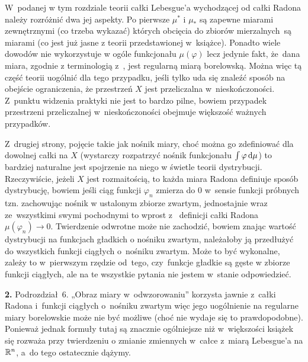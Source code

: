 \documentclass[a4paper,11pt]{article}
\begin{document}
\vspace{\spaceThree}

\start W~podanej w tym rozdziale teorii całki Lebesgue’a wychodzącej
od całki Radona należy rozróżnić dwa jej aspekty. Po pierwsze
$\mu^{ * }$ i $\mu_{ * }$ są zapewne miarami zewnętrznymi (co trzeba
wykazać) których obcięcia do zbiorów mierzalnych~są miarami (co jest
już jasne z teorii przedstawionej w~książce). Ponadto wiele dowodów
nie wykorzystuje w ogóle funkcjonału $\mu( \varphi )$ lecz jedynie fakt,
że~dana miara, zgodnie z terminologią z~\cite{RudinAnalizaRzeczywistaIZespolona1998}, jest regularną
miarą borelowską. Można więc tą część teorii uogólnić dla tego
przypadku, jeśli tylko uda się znaleźć sposób na obejście
ograniczenia, że przestrzeń $X$ jest przeliczalna w~nieskończoności.
Z~punktu widzenia praktyki nie jest to bardzo pilne, bowiem przypadek
przestrzeni przeliczalnej w~nieskończoności obejmuje większość ważnych
przypadków.

Z~drugiej strony, pojęcie takie jak nośnik miary, choć można go
zdefiniować dla dowolnej całki na $X$ (wystarczy rozpatrzyć nośnik
funkcjonału $\int \varphi \, \mathrm{d} \mu$) to bardziej naturalne jest
spojrzenie na niego w świetle teorii dystrybucji. Rzeczywiście, jeżeli
$X$ jest rozmaitością, to każda miara Radona definiuje sposób
dystrybucję, bowiem jeśli ciąg funkcji $\varphi_{ n }$ zmierza do 0
w~sensie funkcji próbnych tzn. zachowując nośnik w ustalonym zbiorze
zwartym, jednostajnie wraz ze~wszystkimi swymi pochodnymi to wprost z~
definicji całki Radona $\mu( \varphi_{ n } ) \to 0$. Twierdzenie odwrotne
może nie zachodzić, bowiem znając wartość dystrybucji na funkcjach
gładkich o nośniku zwartym, należałoby ją przedłużyć do wszystkich
funkcji ciągłych o~nośniku zwartym. Może to być wykonalne, zależy to
w~pierwszym rzędzie od~tego, czy~funkcje gładkie są gęste w zbiorze
funkcji ciągłych, ale na te wszystkie pytania nie jestem w~stanie
odpowiedzieć.

\vspace{\spaceFour}


\start \textbf{2.} Podrozdział~6. „Obraz miary w~odwzorowaniu”
korzysta jawnie z~całki Radona i~funkcji ciągłych o~nośniku zwartym
więc jego uogólnienie na regularne miary borelowskie może nie być
możliwe (choć nie wydaje się to prawdopodobne). Ponieważ jednak
formuły tutaj są znacznie ogólniejsze niż w~większości książek się
rozważa przy twierdzeniu o zmianie zmiennych w~całce z~miarą
Lebesgue’a na $\mathbb{R}^{ n }$, a~do tego ostatecznie dążymy.

\vspace{\spaceFour}
\end{document}
